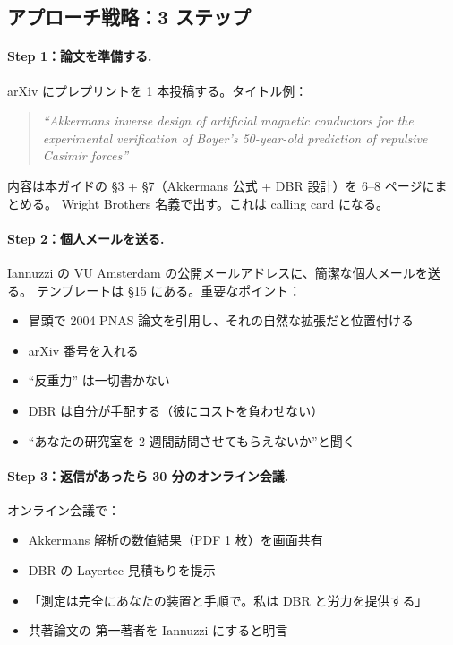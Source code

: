 \documentclass[11pt,a4paper]{article}
\def\textbf#1{#1}%
\begin{document}
\subsection{アプローチ戦略：3 ステップ}

\paragraph{Step 1：論文を準備する.}
arXiv にプレプリントを 1 本投稿する。タイトル例：

\begin{quote}
\itshape
``Akkermans inverse design of artificial magnetic conductors for the
experimental verification of Boyer's 50-year-old prediction of repulsive
Casimir forces''
\end{quote}

内容は本ガイドの §3 + §7（Akkermans 公式 + DBR 設計）を 6--8 ページにまとめる。
Wright Brothers 名義で出す。これは \textbf{calling card} になる。

\paragraph{Step 2：個人メールを送る.}
Iannuzzi の VU Amsterdam の公開メールアドレスに、簡潔な個人メールを送る。
テンプレートは §15 にある。重要なポイント：

\begin{itemize}
\item \textbf{冒頭で 2004 PNAS 論文を引用}し、それの自然な拡張だと位置付ける
\item arXiv 番号を入れる
\item ``反重力'' は一切書かない
\item \textbf{DBR は自分が手配する}（彼にコストを負わせない）
\item ``あなたの研究室を 2 週間訪問させてもらえないか''と聞く
\end{itemize}

\paragraph{Step 3：返信があったら 30 分のオンライン会議.}
オンライン会議で：
\begin{itemize}
\item Akkermans 解析の数値結果（PDF 1 枚）を画面共有
\item DBR の Layertec 見積もりを提示
\item 「測定は完全にあなたの装置と手順で。私は DBR と労力を提供する」
\item 共著論文の \textbf{第一著者を Iannuzzi にする}と明言
\end{itemize}
\end{document}
